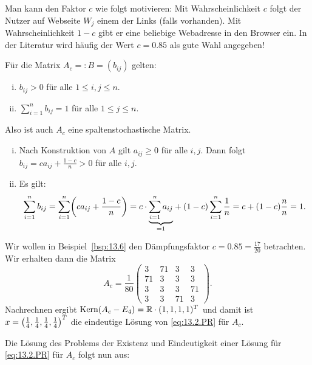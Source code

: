 Man kann den Faktor $c$ wie folgt motivieren:
Mit Wahrscheinlichkeit $c$ folgt der Nutzer auf Webseite $W_j$ einem der Links (falls vorhanden).
Mit Wahrscheinlichkeit $1-c$ gibt er eine beliebige Webadresse in den Browser ein.
In der Literatur wird häufig der Wert $c = 0.85$ als gute Wahl angegeben!

\begin{lemma}
	\label{lemma:13.8}
	Für die Matrix $A_c =: B = (b_{ij})$ gelten:
	\begin{enumerate}[(i)]
		\item $b_{ij} > 0$ für alle $1 \leq i,j \leq n$.
		\item $\sum_{i=1}^{n} b_{ij} = 1$ für alle $1 \leq j \leq n$.
	\end{enumerate}
	Also ist auch $A_c$ eine spaltenstochastische Matrix.
\end{lemma}

\begin{beweis}
	\begin{enumerate}[(i)]
		\item Nach Konstruktion von $A$ gilt $a_{ij} \geq 0$ für alle $i,j$.
		Dann folgt $b_{ij} = ca_{ij} + \frac{1-c}{n} > 0$ für alle $i,j$.
		\item Es gilt: 
		\[
			\sum_{i=1}^{n} b_{ij} = \sum_{i=1}^{n} \enb{ca_{ij} + \frac{1-c}{n}} = c \cdot \Underbrace{\sum_{i=1}^{n} a_{ij}}{=1} + (1-c) \sum_{i=1}^{n} \frac{1}{n} = c+(1-c) \frac{n}{n} = 1. 
		\]
	\end{enumerate}
	
\end{beweis}

\begin{beispiel}
	\label{bsp:13.9}
	Wir wollen in Beispiel~\ref{bsp:13.6} den Dämpfungsfaktor $c = 0.85 = \frac{17}{20}$ betrachten.
	Wir erhalten dann die Matrix
	\[
		A_c = \frac{1}{80} \begin{pmatrix}
			3  & 71 & 3  & 3  \\
			71 & 3  & 3  & 3  \\
			3  & 3  & 3  & 71 \\
			3  & 3  & 71 & 3
		\end{pmatrix}. 
	\]
	Nachrechnen ergibt $\operatorname{Kern}(A_c - E_4) = \mathbb{R} \cdot (1,1,1,1)^T$ und damit ist $x = \left(\frac{1}{4},\frac{1}{4},\frac{1}{4},\frac{1}{4}\right)^T$ die eindeutige Lösung von \eqref{eq:13.2.PR} für $A_c$.
\end{beispiel}

Die Lösung des Problems der Existenz und Eindeutigkeit einer Lösung für \eqref{eq:13.2.PR} für $A_c$ folgt nun aus:

